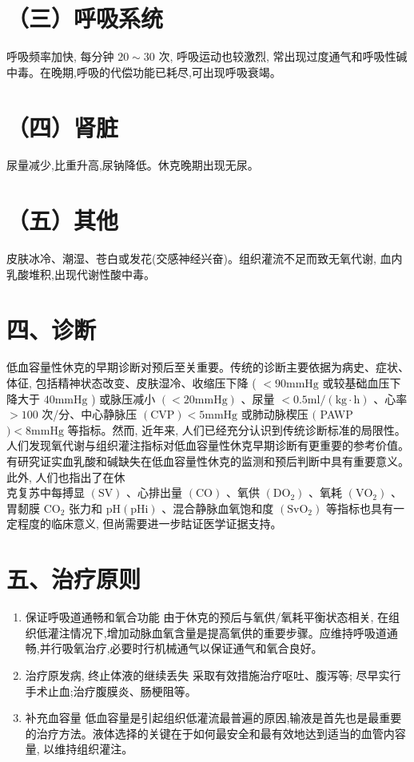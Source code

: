 \documentclass[10pt]{article}
\begin{document}
\section*{（三）呼吸系统}
呼吸频率加快, 每分钟 $20 \sim 30$ 次, 呼吸运动也较激烈, 常出现过度通气和呼吸性碱中毒。在晚期,呼吸的代偿功能已耗尽,可出现呼吸衰竭。

\section*{（四）肾脏}
尿量减少,比重升高,尿钠降低。休克晚期出现无尿。

\section*{（五）其他}
皮肤冰冷、潮湿、苍白或发花(交感神经兴奋)。组织灌流不足而致无氧代谢, 血内乳酸堆积,出现代谢性酸中毒。

\section*{四、诊断}
低血容量性休克的早期诊断对预后至关重要。传统的诊断主要依据为病史、症状、体征, 包括精神状态改变、皮肤湿冷、收缩压下降 ( $<90 \mathrm{mmHg}$ 或较基础血压下降大于 $40 \mathrm{mmHg}$ ) 或脉压减小 $(<20 \mathrm{mmHg})$ 、尿量 $<0.5 \mathrm{ml} /(\mathrm{kg} \cdot \mathrm{h})$ 、心率 $>100$ 次/分、中心静脉压 $(\mathrm{CVP})<5 \mathrm{mmHg}$ 或肺动脉楔压 $($ PAWP $)<8 \mathrm{mmHg}$ 等指标。然而, 近年来, 人们已经充分认识到传统诊断标准的局限性。人们发现氧代谢与组织灌注指标对低血容量性休克早期诊断有更重要的参考价值。有研究证实血乳酸和碱缺失在低血容量性休克的监测和预后判断中具有重要意义。此外, 人们也指出了在休\\
克复苏中每搏显 $(\mathrm{SV})$ 、心排出量 $(\mathrm{CO})$ 、氧供 $\left(\mathrm{DO}_{2}\right)$ 、氧耗 $\left(\mathrm{VO}_{2}\right)$ 、胃䵑膜 $\mathrm{CO}_{2}$ 张力和 $\mathrm{pH}(\mathrm{pHi})$ 、混合静脉血氧饱和度 $\left(\mathrm{SvO}_{2}\right)$ 等指标也具有一定程度的临床意义, 但尚需要进一步䀦证医学证据支持。

\section*{五、治疗原则}
\begin{enumerate}
  \item 保证呼吸道通畅和氧合功能 由于休克的预后与氧供/氧耗平衡状态相关, 在组织低灌注情况下,增加动脉血氧含量是提高氧供的重要步骤。应维持呼吸道通畅,并行吸氧治疗,必要时行机械通气以保证通气和氧合良好。

  \item 治疗原发病, 终止体液的继续丢失 采取有效措施治疗呕吐、腹泻等; 尽早实行手术止血;治疗腹膜炎、肠梗阻等。

  \item 补充血容量 低血容量是引起组织低灌流最普遍的原因,输液是首先也是最重要的治疗方法。液体选择的关键在于如何最安全和最有效地达到适当的血管内容量, 以维持组织灌注。

\end{enumerate}
\end{document}
